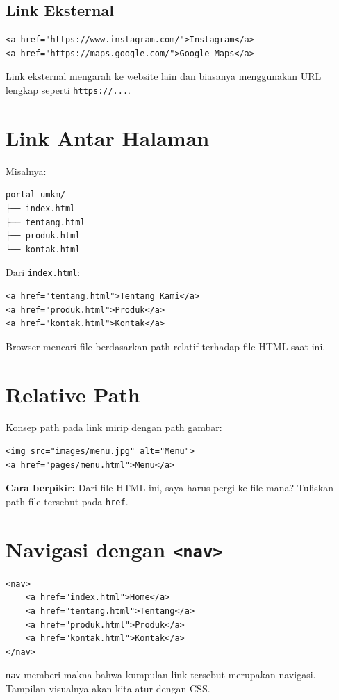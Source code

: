 \documentclass[11pt,a4paper]{article}
\begin{document}
\subsection{Link Eksternal}
\begin{lstlisting}[style=htmlstyle]
<a href="https://www.instagram.com/">Instagram</a>
<a href="https://maps.google.com/">Google Maps</a>
\end{lstlisting}
Link eksternal mengarah ke website lain dan biasanya menggunakan URL lengkap seperti \texttt{https://...}.

\section{Link Antar Halaman}
Misalnya:
\begin{lstlisting}[style=htmlstyle]
portal-umkm/
├── index.html
├── tentang.html
├── produk.html
└── kontak.html
\end{lstlisting}
Dari \texttt{index.html}:
\begin{lstlisting}[style=htmlstyle]
<a href="tentang.html">Tentang Kami</a>
<a href="produk.html">Produk</a>
<a href="kontak.html">Kontak</a>
\end{lstlisting}
Browser mencari file berdasarkan path relatif terhadap file HTML saat ini.

\section{Relative Path}
Konsep path pada link mirip dengan path gambar:
\begin{lstlisting}[style=htmlstyle]
<img src="images/menu.jpg" alt="Menu">
<a href="pages/menu.html">Menu</a>
\end{lstlisting}
\begin{conceptbox}\textbf{Cara berpikir:} Dari file HTML ini, saya harus pergi ke file mana? Tuliskan path file tersebut pada \texttt{href}.
\end{conceptbox}

\section{Navigasi dengan \texttt{<nav>}}
\begin{lstlisting}[style=htmlstyle]
<nav>
    <a href="index.html">Home</a>
    <a href="tentang.html">Tentang</a>
    <a href="produk.html">Produk</a>
    <a href="kontak.html">Kontak</a>
</nav>
\end{lstlisting}
\texttt{nav} memberi makna bahwa kumpulan link tersebut merupakan navigasi. Tampilan visualnya akan kita atur dengan CSS.
\end{document}
